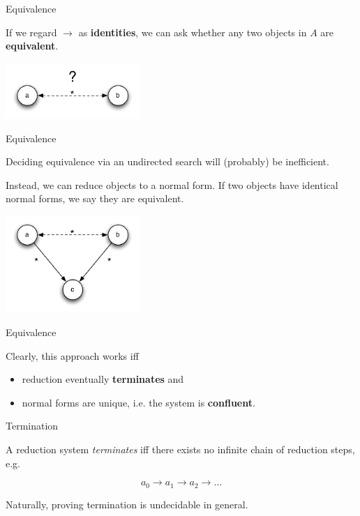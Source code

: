 \documentclass{beamer}
\begin{document}
\begin{frame}{Equivalence}

If we regard $\to$ as \textbf{identities}, we can ask whether any two objects
in $A$ are \textbf{equivalent}.

\begin{center}
\includegraphics[width=2in]{images/equivalence}
\end{center}

\end{frame}


\begin{frame}{Equivalence}

Deciding equivalence via an undirected search will (probably) be inefficient.

Instead, we can reduce objects to a normal form. If two objects have identical
normal forms, we say they are equivalent.

\begin{center}
\includegraphics[width=2in]{images/church-rosser}
\end{center}

\end{frame}


\begin{frame}{Equivalence}

Clearly, this approach works iff

\begin{itemize}
  \item reduction eventually \textbf{terminates} and
  \item normal forms are unique, i.e. the system is \textbf{confluent}.
\end{itemize}

\end{frame}


\begin{frame}{Termination}

A reduction system \emph{terminates} iff there exists no infinite chain of
reduction steps, e.g.

\[
a_0 \to a_1 \to a_2 \to \ldots
\]

Naturally, proving termination is undecidable in general.

\end{frame}
\end{document}
